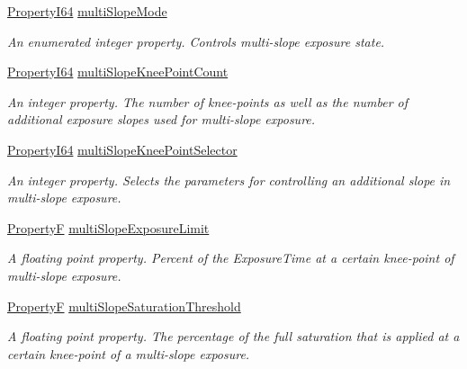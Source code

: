 \begin{DoxyCompactItemize}
\hyperlink{group___common_interface_ga81749b2696755513663492664a18a893}{Property\+I64} \hyperlink{classmv_i_m_p_a_c_t_1_1acquire_1_1_gen_i_cam_1_1_acquisition_control_a4b9b632e3144d6dd2976c55e87528a53}{multi\+Slope\+Mode}
\begin{DoxyCompactList}\small\item\em An enumerated integer property. Controls multi-\/slope exposure state. \end{DoxyCompactList}\item 
\hyperlink{group___common_interface_ga81749b2696755513663492664a18a893}{Property\+I64} \hyperlink{classmv_i_m_p_a_c_t_1_1acquire_1_1_gen_i_cam_1_1_acquisition_control_afc16354b0a7a9477a9dc50b3c0a50275}{multi\+Slope\+Knee\+Point\+Count}
\begin{DoxyCompactList}\small\item\em An integer property. The number of knee-\/points as well as the number of additional exposure slopes used for multi-\/slope exposure. \end{DoxyCompactList}\item 
\hyperlink{group___common_interface_ga81749b2696755513663492664a18a893}{Property\+I64} \hyperlink{classmv_i_m_p_a_c_t_1_1acquire_1_1_gen_i_cam_1_1_acquisition_control_ab127490b47734b9979d17ffec2c803e0}{multi\+Slope\+Knee\+Point\+Selector}
\begin{DoxyCompactList}\small\item\em An integer property. Selects the parameters for controlling an additional slope in multi-\/slope exposure. \end{DoxyCompactList}\item 
\hyperlink{group___common_interface_gaf54865fe5a3d5cfd15f9a111b40d09f9}{Property\+F} \hyperlink{classmv_i_m_p_a_c_t_1_1acquire_1_1_gen_i_cam_1_1_acquisition_control_acdf0b3638aaaa29315dfe1a7ff9cce35}{multi\+Slope\+Exposure\+Limit}
\begin{DoxyCompactList}\small\item\em A floating point property. Percent of the Exposure\+Time at a certain knee-\/point of multi-\/slope exposure. \end{DoxyCompactList}\item 
\hyperlink{group___common_interface_gaf54865fe5a3d5cfd15f9a111b40d09f9}{Property\+F} \hyperlink{classmv_i_m_p_a_c_t_1_1acquire_1_1_gen_i_cam_1_1_acquisition_control_a6e6415c2be2fd0e16314ed053bdae6bd}{multi\+Slope\+Saturation\+Threshold}
\begin{DoxyCompactList}\small\item\em A floating point property. The percentage of the full saturation that is applied at a certain knee-\/point of a multi-\/slope exposure. \end{DoxyCompactList}\item 

\end{DoxyCompactItemize}
